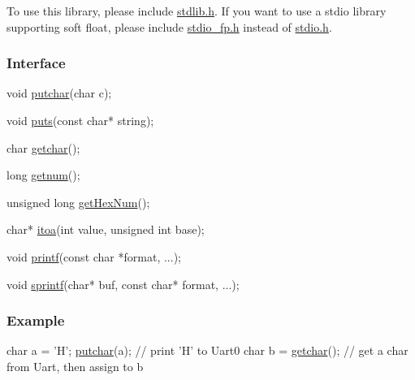 To use this library, please include {\ttfamily \mbox{\hyperlink{a00116}{stdlib.\+h}}}. If you want to use a stdio library supporting soft float, please include {\ttfamily \mbox{\hyperlink{a00104}{stdio\+\_\+fp.\+h}}} instead of {\ttfamily \mbox{\hyperlink{a00095}{stdio.\+h}}}.

\subsubsection*{Interface}


\begin{DoxyCode}
\textcolor{keywordtype}{void} \mbox{\hyperlink{a00095_a948b7a0779c308ac5502c57e282e6933}{putchar}}(\textcolor{keywordtype}{char} c);

\textcolor{keywordtype}{void} \mbox{\hyperlink{a00095_a46036bd75b920766eef64eb7910c887d}{puts}}(\textcolor{keyword}{const} \textcolor{keywordtype}{char}* \textcolor{keywordtype}{string});

\textcolor{keywordtype}{char} \mbox{\hyperlink{a00095_a0979671914792955a7a68461634ff82d}{getchar}}();

\textcolor{keywordtype}{long} \mbox{\hyperlink{a00095_a46d9f17d80612d1174eab96f53c7c5b7}{getnum}}();

\textcolor{keywordtype}{unsigned} \textcolor{keywordtype}{long} \mbox{\hyperlink{a00095_af48103646b7cb053e55eb3867a05fc85}{getHexNum}}();

\textcolor{keywordtype}{char}* \mbox{\hyperlink{a00095_ac399b37e5355c704e130b1c6f60b71ec}{itoa}}(\textcolor{keywordtype}{int} value, \textcolor{keywordtype}{unsigned} \textcolor{keywordtype}{int} base);

\textcolor{keywordtype}{void} \mbox{\hyperlink{a00095_a133c04c35a1c14c6f8d8078831705661}{printf}}(\textcolor{keyword}{const} \textcolor{keywordtype}{char} *format, ...);

\textcolor{keywordtype}{void} \mbox{\hyperlink{a00095_ab416b2a62f47ec0095853e37ba84e78b}{sprintf}}(\textcolor{keywordtype}{char}* buf, \textcolor{keyword}{const} \textcolor{keywordtype}{char}* format, ...);
\end{DoxyCode}


\subsubsection*{Example}


\begin{DoxyCode}
\textcolor{keywordtype}{char} a = \textcolor{charliteral}{'H'}; \mbox{\hyperlink{a00095_a948b7a0779c308ac5502c57e282e6933}{putchar}}(a);            \textcolor{comment}{// print 'H' to Uart0}
\textcolor{keywordtype}{char} b = \mbox{\hyperlink{a00095_a0979671914792955a7a68461634ff82d}{getchar}}();                  \textcolor{comment}{// get a char from Uart, then assign to b}
\end{DoxyCode}
 
